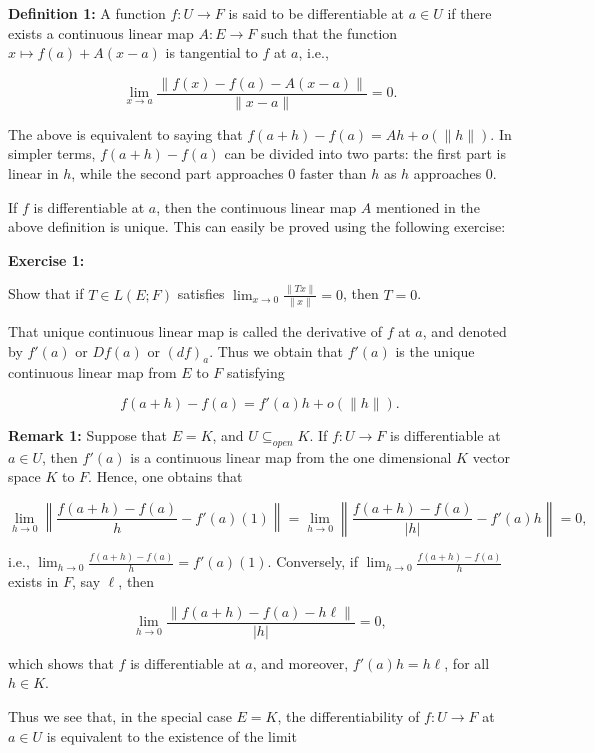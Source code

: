 \documentclass{book}
\begin{document}
\vspace{1cm}

\textbf{Definition 1:} A function $f : U \to F$ is said to be differentiable at $a \in U$ if there exists a continuous linear map $A : E \to F$ such that the function $x \mapsto f(a) + A(x - a)$ is tangential to $f$ at $a$, i.e.,

\[
\lim_{x \to a} \frac{\|f(x) - f(a) - A(x - a)\|}{\|x - a\|} = 0.
\]

The above is equivalent to saying that $f(a + h) - f(a) = Ah + o(\|h\|)$. In simpler terms, $f(a + h) - f(a)$ can be divided into two parts: the first part is linear in $h$, while the second part approaches 0 faster than $h$ as $h$ approaches 0.

If $f$ is differentiable at $a$, then the continuous linear map $A$ mentioned in the above definition is unique. This can easily be proved using the following exercise:

\vspace{1cm}

\textbf{Exercise 1:}

Show that if $T \in L(E; F)$ satisfies $\lim_{x \to 0} \frac{\|Tx\|}{\|x\|} = 0$, then $T = 0$.

That unique continuous linear map is called the derivative of $f$ at $a$, and denoted by $f'(a)$ or $Df(a)$ or $(df)_a$. Thus we obtain that $f'(a)$ is the unique continuous linear map from $E$ to $F$ satisfying

\[
f(a + h) - f(a) = f'(a)h + o(\|h\|).
\]

\vspace{1cm}
\textbf{Remark 1:} Suppose that $E = K$, and $U \subseteq_{open} K$. If $f : U \to F$ is differentiable at $a \in U$, then $f'(a)$ is a continuous linear map from the one dimensional $K$ vector space $K$ to $F$. Hence, one obtains that

\[
\lim_{h \to 0} \left\| \frac{f(a + h) - f(a)}{h} - f'(a)(1) \right\|
=
\lim_{h \to 0} \left\| \frac{f(a + h) - f(a)}{|h|} - f'(a)h \right\|
= 0,
\]

i.e., $\lim_{h \to 0} \frac{f(a+h)-f(a)}{h} = f'(a)(1)$. Conversely, if $\lim_{h \to 0} \frac{f(a+h)-f(a)}{h}$ exists in $F$, say $\ell$, then

\[
\lim_{h \to 0} \frac{\|f(a + h) - f(a) - h\ell\|}{|h|} = 0,
\]

which shows that $f$ is differentiable at $a$, and moreover, $f'(a)h = h\ell$, for all $h \in K$. 

Thus we see that, in the special case $E = K$, the differentiability of $f : U \to F$ at $a \in U$ is equivalent to the existence of the limit 
\end{document}
